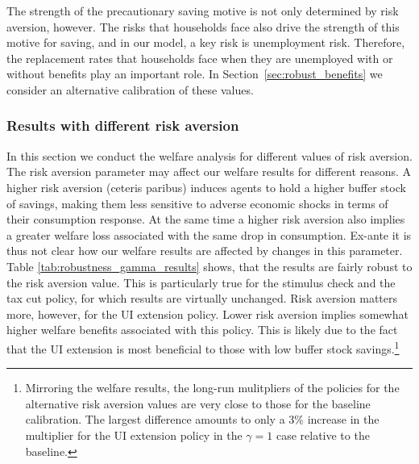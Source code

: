 \documentclass[../HAFiscal]{subfiles}
\begin{document}
The strength of the precautionary saving motive is not only determined by risk aversion, however. The risks that households face also drive the strength of this motive for saving, and in our model, a key risk is unemployment risk. Therefore, the replacement rates that households face when they are unemployed with or without benefits play an important role. In Section~\ref{sec:robust_benefits} we consider an alternative calibration of these values. 

\subsubsection{Results with different risk aversion}
\label{sec:robust_gamma_results}

In this section we conduct the welfare analysis for different values of risk aversion. The risk aversion parameter may affect our welfare results for different reasons. A higher risk aversion (ceteris paribus) induces agents to hold a higher buffer stock of savings, making them less sensitive to adverse economic shocks in terms of their consumption response. At the same time a higher risk aversion also implies a greater welfare loss associated with the same drop in consumption. Ex-ante it is thus not clear how our welfare results are affected by changes in this parameter. Table \ref{tab:robustness_gamma_results} shows, that the results are fairly robust to the risk aversion value. This is particularly true for the stimulus check and the tax cut policy, for which results are virtually unchanged. Risk aversion matters more, however, for the UI extension policy. Lower risk aversion implies somewhat higher welfare benefits associated with this policy. This is likely due to the fact that the UI extension is most beneficial to those with low buffer stock savings.\footnote{Mirroring the welfare results, the long-run mulitpliers of the policies  for the alternative risk aversion values are very close to those for the baseline calibration. The largest difference amounts to only a 3\% increase in the multiplier for the UI extension policy in the $\gamma = 1$ case relative to the baseline.}
\end{document}
